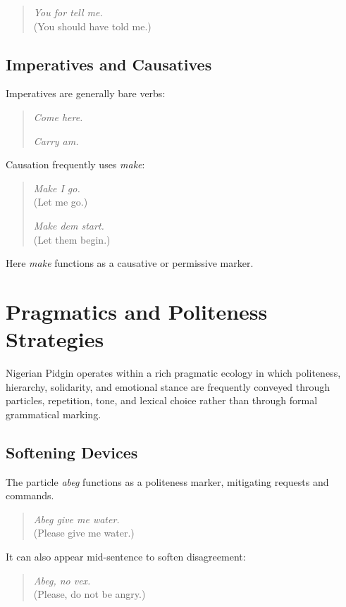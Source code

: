 \documentclass[12pt]{article}
\begin{document}
\begin{quote}
\textit{You for tell me.} \\
(You should have told me.)
\end{quote}

\subsection{Imperatives and Causatives}

Imperatives are generally bare verbs:

\begin{quote}
\textit{Come here.}

\textit{Carry am.}
\end{quote}

Causation frequently uses \textit{make}:

\begin{quote}
\textit{Make I go.} \\
(Let me go.)

\textit{Make dem start.} \\
(Let them begin.)
\end{quote}

Here \textit{make} functions as a causative or permissive marker.

\section{Pragmatics and Politeness Strategies}

Nigerian Pidgin operates within a rich pragmatic ecology in which politeness, hierarchy, solidarity, and emotional stance are frequently conveyed through particles, repetition, tone, and lexical choice rather than through formal grammatical marking.

\subsection{Softening Devices}

The particle \textit{abeg} functions as a politeness marker, mitigating requests and commands.

\begin{quote}
\textit{Abeg give me water.} \\
(Please give me water.)
\end{quote}

It can also appear mid-sentence to soften disagreement:

\begin{quote}
\textit{Abeg, no vex.} \\
(Please, do not be angry.)
\end{quote}
\end{document}
